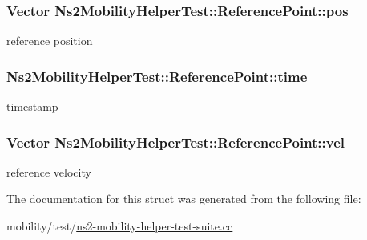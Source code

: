\subsubsection[{\texorpdfstring{pos}{pos}}]{\setlength{\rightskip}{0pt plus 5cm}Vector Ns2\+Mobility\+Helper\+Test\+::\+Reference\+Point\+::pos}\hypertarget{structNs2MobilityHelperTest_1_1ReferencePoint_a6edac39e5b4dc90d23f87f203df974c8}{}\label{structNs2MobilityHelperTest_1_1ReferencePoint_a6edac39e5b4dc90d23f87f203df974c8}


reference position 

\subsubsection[{\texorpdfstring{time}{time}}]{ Ns2\+Mobility\+Helper\+Test\+::\+Reference\+Point\+::time}\hypertarget{structNs2MobilityHelperTest_1_1ReferencePoint_af7c24766bd747de6f4e7b04c6ed1d9d8}{}\label{structNs2MobilityHelperTest_1_1ReferencePoint_af7c24766bd747de6f4e7b04c6ed1d9d8}


timestamp 

\subsubsection[{\texorpdfstring{vel}{vel}}]{\setlength{\rightskip}{0pt plus 5cm}Vector Ns2\+Mobility\+Helper\+Test\+::\+Reference\+Point\+::vel}\hypertarget{structNs2MobilityHelperTest_1_1ReferencePoint_ad0497008eed66c96fb0cf8484b734e99}{}\label{structNs2MobilityHelperTest_1_1ReferencePoint_ad0497008eed66c96fb0cf8484b734e99}


reference velocity 



The documentation for this struct was generated from the following file\+:\begin{DoxyCompactItemize}
\item 
mobility/test/\hyperlink{ns2-mobility-helper-test-suite_8cc}{ns2-\/mobility-\/helper-\/test-\/suite.\+cc}\end{DoxyCompactItemize}
